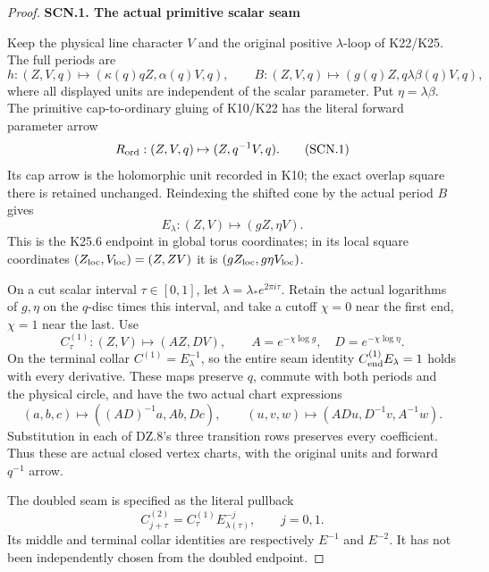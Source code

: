 \begin{proof}
\par

\medskip\noindent\textbf{SCN.1. The actual primitive scalar seam}

\par\nobreak

Keep the physical line character \(V\) and the original positive
\(\lambda\)-loop of K22/K25. The full periods are
\[
 h:(Z,V,q)\mapsto(\kappa(q)qZ,\alpha(q)V,q),\qquad
 B:(Z,V,q)\mapsto(g(q)Z,q\lambda\beta(q)V,q),
\]
where all displayed units are independent of the scalar parameter.
Put \(\eta=\lambda\beta\). The primitive cap-to-ordinary gluing of
K10/K22 has the literal forward parameter arrow
\[
                  R_{\rm ord}:(Z,V,q)\mapsto(Z,q^{-1}V,q).
                                                        \tag{SCN.1}
\]
Its cap arrow is the holomorphic unit recorded in K10; the exact
overlap square there is retained unchanged. Reindexing the shifted
cone by the actual period \(B\) gives
\[
                    E_\lambda:(Z,V)\mapsto(gZ,\eta V).
                                                        \tag{SCN.2}
\]
This is the K25.6 endpoint in global torus coordinates; in its
local square coordinates \((Z_{\rm loc},V_{\rm loc})=(Z,ZV)\)
it is \((gZ_{\rm loc},g\eta V_{\rm loc})\).

On a cut scalar interval \(\tau\in[0,1]\), let
\(\lambda=\lambda_*e^{2\pi i\tau}\). Retain the actual logarithms
of \(g,\eta\) on the \(q\)-disc times this interval, and take a
cutoff \(\chi=0\) near the first end, \(\chi=1\) near the last.
Use
\[
 C^{(1)}_\tau:(Z,V)\mapsto(AZ,DV),\qquad
 A=e^{-\chi\log g},\quad D=e^{-\chi\log\eta}.         \tag{SCN.3}
\]
On the terminal collar \(C^{(1)}=E_\lambda^{-1}\), so the
entire seam identity \(C_{\rm end}^{(1)}E_\lambda=1\) holds
with every derivative. These maps preserve \(q\), commute with
both periods and the physical circle, and have the two actual
chart expressions
\[
 (a,b,c)\mapsto((AD)^{-1}a,Ab,Dc),\qquad
 (u,v,w)\mapsto(ADu,D^{-1}v,A^{-1}w).
                                                        \tag{SCN.4}
\]
Substitution in each of DZ.8's three transition rows preserves
every coefficient. Thus these are actual closed vertex charts,
with the original units and forward \(q^{-1}\) arrow.

The doubled seam is specified as the literal pullback
\[
 C^{(2)}_{j+\tau}=C^{(1)}_\tau E_{\lambda(\tau)}^{-j},
                       \qquad j=0,1.                \tag{SCN.5}
\]
Its middle and terminal collar identities are respectively
\(E^{-1}\) and \(E^{-2}\). It has not been independently chosen
from the doubled endpoint.


\end{proof}
